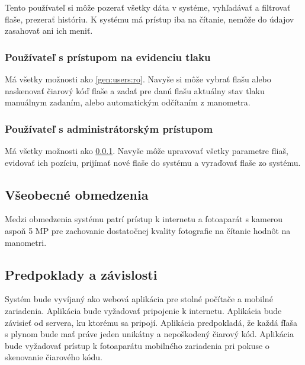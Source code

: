 \documentclass[hreffootnote]{zah}
\begin{document}
Tento používateľ si môže pozerať všetky dáta v systéme, vyhľadávať a filtrovať flaše, prezerať históriu. K systému má prístup iba na čítanie, nemôže do údajov zasahovať ani ich meniť.

\subsubsection{Používateľ s prístupom na evidenciu tlaku}
\label{gen:users:meter}

Má všetky možnosti ako \ref{gen:users:ro}. Navyše si môže vybrať flašu alebo naskenovať čiarový kóď flaše a zadať pre danú flašu aktuálny stav tlaku manuálnym zadaním, alebo automatickým odčítaním z manometra.

\subsubsection{Používateľ s administrátorským prístupom}
\label{gen:users:admin}

Má všetky možnosti ako \ref{gen:users:meter}. Navyše môže upravovať všetky parametre fliaš, evidovať ich pozíciu, prijímať nové flaše do systému a vyraďovať flaše zo systému.

\subsection{Všeobecné obmedzenia}
\label{gen:constraints}

Medzi obmedzenia systému patrí prístup k internetu a fotoaparát s kamerou aspoň 5 MP pre zachovanie dostatočnej kvality fotografie na čítanie hodnôt na manometri. 

\subsection{Predpoklady a závislosti}
\label{gen:deps}

Systém bude vyvíjaný ako webová aplikácia pre stolné počítače a mobilné zariadenia. Aplikácia bude vyžadovať pripojenie k internetu. Aplikácia bude závisieť od servera, ku ktorému sa pripojí. Aplikácia predpokladá, že každá fľaša s plynom bude mať práve jeden unikátny a nepoškodený čiarový kód. Aplikácia bude vyžadovať prístup k fotoaparátu mobilného zariadenia pri pokuse o skenovanie čiarového kódu.

\cleardoublepage
\end{document}
